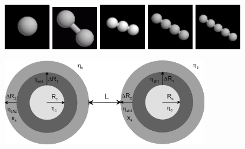 \begin{figure}[htb]
\begin{center}
\includegraphics[width=0.18\textwidth]{../images/form_factor/cluster/tetrahedron1.png}
\includegraphics[width=0.18\textwidth]{../images/form_factor/cluster/tetrahedron2.png}
\includegraphics[width=0.18\textwidth]{../images/form_factor/cluster/DoubleShellChain3.png}
\includegraphics[width=0.18\textwidth]{../images/form_factor/cluster/DoubleShellChain4.png}
\includegraphics[width=0.18\textwidth]{../images/form_factor/cluster/DoubleShellChain5.png}
\end{center}
\caption{} \label{doubleshellchain}
\end{figure}

\begin{figure}[htb]
\begin{center}
\includegraphics[width=0.8\textwidth]{../images/form_factor/cluster/l_doubleshell.png}
\end{center}
\caption{} \label{doubleshell}
\end{figure}

